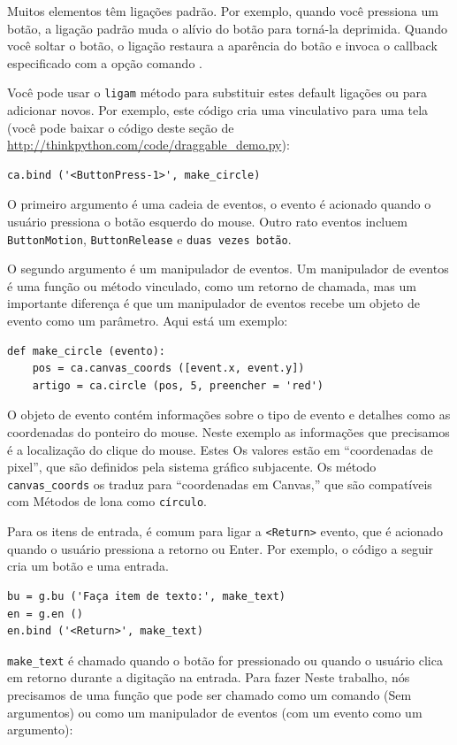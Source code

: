 \documentclass[10pt]{book}
\begin{document}
\begin{exercise}
\begin{v erbatim}
Muitos elementos têm ligações padrão. Por exemplo, quando você pressiona
um botão, a ligação padrão muda o alívio do botão
para torná-la deprimida. Quando você soltar o botão, o
ligação restaura a aparência do botão e invoca o
callback especificado com a opção {comando \tt}.

Você pode usar o {\tt ligam} método para substituir estes default
ligações ou para adicionar novos. Por exemplo, este código cria uma
vinculativo para uma tela (você pode baixar o código deste
seção de \url{http://thinkpython.com/code/draggable_demo.py}):

\begin{verbatim}
ca.bind ('<ButtonPress-1>', make_circle)
\end{verbatim}
%
O primeiro argumento é uma cadeia de eventos, o evento é acionado
quando o usuário pressiona o botão esquerdo do mouse. Outro rato
eventos incluem {\tt ButtonMotion}, {\tt ButtonRelease} e
{\tt duas vezes botão}.

O segundo argumento é um manipulador de eventos. Um manipulador de eventos
é uma função ou método vinculado, como um retorno de chamada, mas um importante
diferença é que um manipulador de eventos recebe um objeto de evento como um
parâmetro. Aqui está um exemplo:

\begin{verbatim}
def make_circle (evento):
    pos = ca.canvas_coords ([event.x, event.y])
    artigo = ca.circle (pos, 5, preencher = 'red')
\end{verbatim}
%
O objeto de evento contém informações sobre o tipo de evento e
detalhes como as coordenadas do ponteiro do mouse. Neste exemplo
as informações que precisamos é
a localização do clique do mouse. Estes
Os valores estão em ``coordenadas de pixel'', que são definidos pela
sistema gráfico subjacente. Os método \verb "canvas_coords"
os traduz para ``coordenadas em Canvas,'' que são compatíveis com
Métodos de lona como {\tt círculo}.

Para os itens de entrada, é comum para ligar a \verb "<Return>" evento,
que é acionado quando o usuário pressiona a {\sf retorno} ou
{\Sf Enter}. Por exemplo, o código a seguir cria um botão
e uma entrada.

\begin{verbatim}
bu = g.bu ('Faça item de texto:', make_text)
en = g.en ()
en.bind ('<Return>', make_text)
\end{verbatim}
%
\Verb "make_text" é chamado quando o botão for pressionado ou quando
o usuário clica em {\sf retorno} durante a digitação na entrada. Para fazer
Neste trabalho, nós precisamos de uma função que pode ser chamado como um comando
(Sem argumentos) ou como um manipulador de eventos (com um evento
como um argumento):


\end{v erbatim}
\end{exercise}
\end{document}
